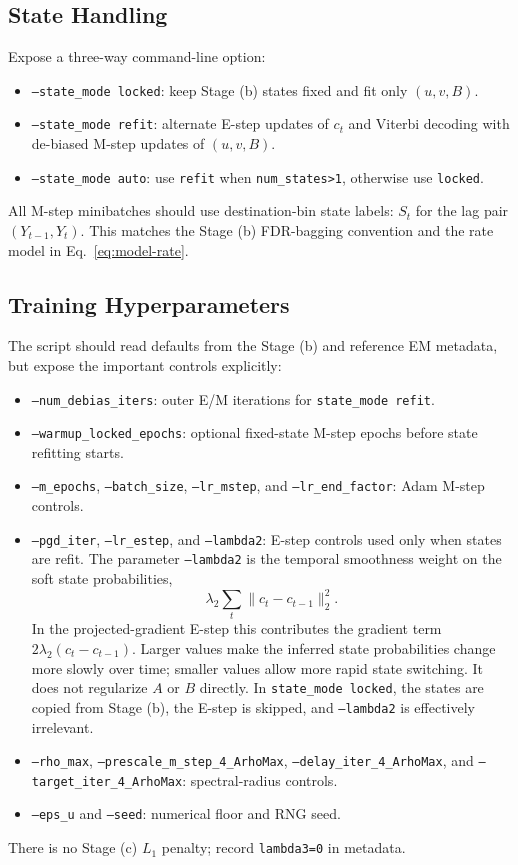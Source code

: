 \documentclass[11pt]{article}
\begin{document}
\subsection{State Handling}

Expose a three-way command-line option:
\begin{itemize}
    \item \texttt{--state\_mode locked}: keep Stage (b) states fixed and fit only
    $(u,v,B)$.
    \item \texttt{--state\_mode refit}: alternate E-step updates of $c_t$ and
    Viterbi decoding with de-biased M-step updates of $(u,v,B)$.
    \item \texttt{--state\_mode auto}: use \texttt{refit} when
    \texttt{num\_states>1}, otherwise use \texttt{locked}.
\end{itemize}
All M-step minibatches should use destination-bin state labels: $S_t$ for
the lag pair $(Y_{t-1},Y_t)$. This matches the Stage (b) FDR-bagging
convention and the rate model in Eq.~\eqref{eq:model-rate}.

\subsection{Training Hyperparameters}

The script should read defaults from the Stage (b) and reference EM metadata,
but expose the important controls explicitly:
\begin{itemize}
    \item \texttt{--num\_debias\_iters}: outer E/M iterations for
    \texttt{state\_mode refit}.
    \item \texttt{--warmup\_locked\_epochs}: optional fixed-state M-step epochs
    before state refitting starts.
    \item \texttt{--m\_epochs}, \texttt{--batch\_size},
    \texttt{--lr\_mstep}, and \texttt{--lr\_end\_factor}: Adam M-step controls.
    \item \texttt{--pgd\_iter}, \texttt{--lr\_estep}, and \texttt{--lambda2}:
    E-step controls used only when states are refit. The parameter
    \texttt{--lambda2} is the temporal smoothness weight on the soft state
    probabilities,
    \[
        \lambda_2 \sum_t \|c_t-c_{t-1}\|_2^2 .
    \]
    In the projected-gradient E-step this contributes the gradient term
    $2\lambda_2(c_t-c_{t-1})$. Larger values make the inferred state
    probabilities change more slowly over time; smaller values allow more
    rapid state switching. It does not regularize $A$ or $B$ directly. In
    \texttt{state\_mode locked}, the states are copied from Stage (b), the
    E-step is skipped, and \texttt{--lambda2} is effectively irrelevant.
    \item \texttt{--rho\_max}, \texttt{--prescale\_m\_step\_4\_ArhoMax},
    \texttt{--delay\_iter\_4\_ArhoMax}, and
    \texttt{--target\_iter\_4\_ArhoMax}: spectral-radius controls.
    \item \texttt{--eps\_u} and \texttt{--seed}: numerical floor and RNG seed.
\end{itemize}
There is no Stage (c) $L_1$ penalty; record \texttt{lambda3=0} in metadata.
\end{document}
